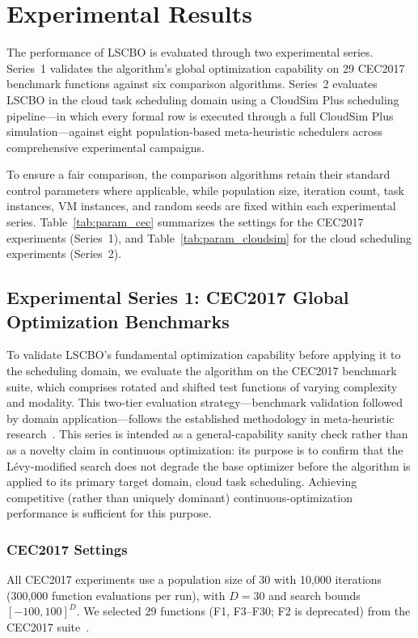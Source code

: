 \documentclass[pdflatex,onecolumn,sn-mathphys-num]{sn-jnl}
\begin{document}
\section{Experimental Results}\label{sec5}

The performance of LSCBO is evaluated through two experimental series. Series~1 validates the algorithm's global optimization capability on 29 CEC2017 benchmark functions against six comparison algorithms. Series~2 evaluates LSCBO in the cloud task scheduling domain using a CloudSim Plus scheduling pipeline---in which every formal row is executed through a full CloudSim Plus simulation---against eight population-based meta-heuristic schedulers across comprehensive experimental campaigns.

To ensure a fair comparison, the comparison algorithms retain their standard control parameters where applicable, while population size, iteration count, task instances, VM instances, and random seeds are fixed within each experimental series. Table~\ref{tab:param_cec} summarizes the settings for the CEC2017 experiments (Series~1), and Table~\ref{tab:param_cloudsim} for the cloud scheduling experiments (Series~2).

\subsection{Experimental Series 1: CEC2017 Global Optimization Benchmarks}\label{sec:cec2017}

To validate LSCBO's fundamental optimization capability before applying it to the scheduling domain, we evaluate the algorithm on the CEC2017 benchmark suite, which comprises rotated and shifted test functions of varying complexity and modality. This two-tier evaluation strategy---benchmark validation followed by domain application---follows the established methodology in meta-heuristic research~\cite{Heidari2019,Mirjalili2016,Khatab2025}. This series is intended as a general-capability sanity check rather than as a novelty claim in continuous optimization: its purpose is to confirm that the L\'{e}vy-modified search does not degrade the base optimizer before the algorithm is applied to its primary target domain, cloud task scheduling. Achieving competitive (rather than uniquely dominant) continuous-optimization performance is sufficient for this purpose.

\subsubsection{CEC2017 Settings}
All CEC2017 experiments use a population size of 30 with 10,000 iterations (300,000 function evaluations per run), with $D=30$ and search bounds $[-100, 100]^D$. We selected 29 functions (F1, F3--F30; F2 is deprecated) from the CEC2017 suite~\cite{CEC2017}.
\end{document}

